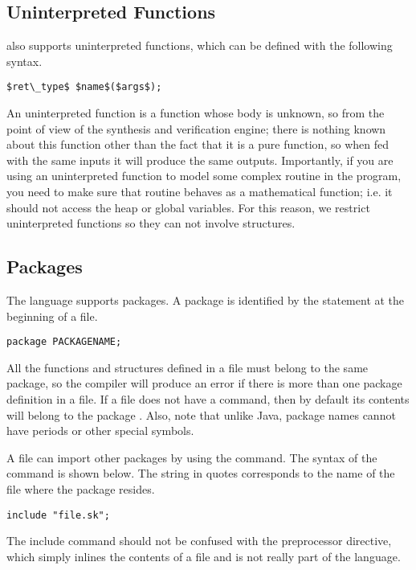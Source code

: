 \subsection{Uninterpreted Functions}
\Sk{} also supports uninterpreted functions, which can be defined with the following syntax.
\begin{lstlisting}
$ret\_type$ $name$($args$);
\end{lstlisting}
An uninterpreted function is a function whose body is unknown, so from the point of view of the synthesis and verification engine; there is nothing known about this function other than the fact that it is a pure function, so when fed with the same inputs it will produce the same outputs. Importantly, if you are using an uninterpreted function to model some complex routine in the program, you need to make sure that routine behaves as a mathematical function; i.e. it should not access the heap or global variables. For this reason, we restrict uninterpreted functions so they can not involve structures.


\subsection{Packages}

The \Sk{} language supports packages. A package is identified by the  statement at the beginning of a file.
\begin{lstlisting}
package PACKAGENAME;
\end{lstlisting}

All the functions and structures defined in a file must belong to the same package, so the compiler will produce an error if there is more than one package definition in a file. If a file does not have a  command, then by default its contents will belong to the package . Also, note that unlike Java, package names cannot have periods or other special symbols. 

A file can import other packages by using the  command. The syntax of the command is shown below. The string in quotes corresponds to the name of the file where the package resides. 

\begin{lstlisting}
include "file.sk";
\end{lstlisting}

The include command should not be confused with the  preprocessor directive, which simply inlines the contents of a file and is not really part of the language. 

